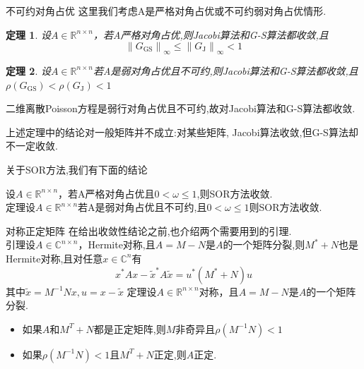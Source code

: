 \documentclass[notheorems,serif]{beamer}
\newcommand{\hei}[1]{{\HEI#1}}
\newtheorem{theorem}{\hei{定理}}
\begin{document}
\begin{frame}
{不可约对角占优}
这里我们考虑A是严格对角占优或不可约弱对角占优情形.
\begin{theorem}
设$A \in \mathbb{R}^{n \times n}$，若A严格对角占优,则Jacobi算法和G-S算法都收敛,且
$$
\left\|G_{\mathrm{GS}}\right\|_{\infty} \leq\left\|G_{\mathrm{J}}\right\|_{\infty}<1
$$
\end{theorem}
\end{frame}

\begin{frame}
\begin{theorem}
设$A \in \mathbb{R}^{n \times n}$若A是弱对角占优且不可约,则Jacobi算法和G-S算法都收敛,且$\rho\left(G_{\mathrm{GS}}\right)<\rho\left(G_{\mathrm{J}}\right)<1$
\end{theorem}

二维离散Poisson方程是弱行对角占优且不可约,故对Jacobi算法和G-S算法都收敛.

上述定理中的结论对一般矩阵并不成立:{\color{blue}对某些矩阵, Jacobi算法收敛,但G-S算法却不一定收敛}.
\end{frame}

\begin{frame}
关于SOR方法,我们有下面的结论

设$A \in \mathbb{R}^{n \times n}$，若A严格对角占优且$0<\omega \leq 1$,则SOR方法收敛.\\
{\color{blue}定理}\quad 设$A \in \mathbb{R}^{n \times n}$若A是弱对角占优且不可约,且$0<\omega \leq 1$则SOR方法收敛.
\end{frame}

\begin{frame}
{对称正定矩阵}
在给出收敛性结论之前,也介绍两个需要用到的引理.\\
{\color{blue}引理}\quad 设$A \in \mathbb{C}^{n \times n}$，Hermite对称,且$A=M-N$是$A$的一个矩阵分裂,则$M^{*}+N$也是Hermite对称,且对任意$x \in \mathbb{C}^{n}$有
$$
x^{*} A x-\tilde{x}^{*} A \tilde{x}=u^{*}\left(M^{*}+N\right) u
$$
其中$\tilde{x}=M^{-1} N x, u=x-\tilde{x}$
{\color{blue}定理}\quad 设$A \in \mathbb{R}^{n \times n}$对称，且$A=M-N$是$A$的一个矩阵分裂.
\begin{itemize}
\item[(1)]如果$A$和$M^{T}+N$都是正定矩阵,则$M$非奇异且$\rho\left(M^{-1} N\right)<1$

\item[(2)]如果$\rho\left(M^{-1} N\right)<1$且$M^{T}+N$正定,则$A$正定.
\end{itemize}
\end{frame}
\end{document}
